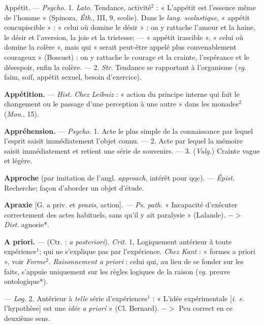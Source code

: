 \begin{itemize}[leftmargin=1cm, label=, itemsep=1pt]
{{{{\item {\bf }Appétit. — \textsf{\textit {Psycho.}} 1. {\it Lato}. Tendance,
activité$^2$ : « L'appétit est l'essence
même de l’homme » (Spinoza, {\it Éth}.,
III, 9, scolie). Dans le {\it lang. scolastique}, « appétit concupiscible » :
« celui où domine le désir » : on y
rattache l'amour et la haine, le désir
et l’aversion, la joie et la tristesse; —
« appétit irascible », « celui où domine
la colère », mais qui « serait peut-être
appelé plus convenablement courageux » (Bossuet) : on y rattache le
courage et la crainte, l'espérance et
le désespoir, enfin la colère. — 2. {\it Str}.
Tendance se rapportant à l'organisme ({\it vg}. faim, soif, appétit sexuel,
besoin d’exercice).

\item {\bf Appétition.} — \textsf{\textit {Hist.}} {\it Chez Leibniz} :
« action du principe interne qui fait
le changement ou le passage d’une
perception à une autre » dans les
monades$^2$ ({\it Mon}., 15).

\item {\bf Appréhension.} — \textsf{\textit {Psycho.}} 1. Acte le
plus simple de la connaissance par
lequel l'esprit saisit immédiatement
l’objet connu. — 2. Acte par lequel
la mémoire saisit immédiatement et
retient une série de souvenirs. —
3. (\textsf{\textit {Vulg.}}) Crainte vague et légère.

\item {\bf Approche} (par imitation de l’angl.
{\it approach}, intérêt pour qqc). —
\textsf{\textit {Épist.}} Recherche; façon d’aborder
un objet d'étude.

\item {\bf Apraxie} [G. a priv. et {\it praxis}, action].
— \textsf{\textit {Ps. path.}} « Incapacité d'exécuter
correctement des actes habituels,
sans qu'il y ait paralysie » (Lalande).
$->$ {\it Dist}. agnosie*.

\item {\bf A priori.} — (Ctr. : {\it a posteriori}). \textsf{\textit {Crit.}}
1, Logiquement antérieur à toute
expérience$^1$; qui ne s'explique pas
par l'expérience. {\it Chez Kant} : « formes
a priori », voir {\it Forme}$^2$. {\it Raisonnement a priori} : celui qui, au lieu de
se fonder sur les faits, s’appuie uniquement sur les règles logiques de la
raison ({\it vg.} preuve ontologique*).

— \textsf{\textit {Log.}} 2. Antérieur à {\it telle} série
d’expériences$^1$ : « L'idée expérimentale [{\it i. e.} l'hypothèse] est une {\it idée
a priori} » (Cl. Bernard). $->$ Peu
correct en ce deuxième sens.

}}}}
\end{itemize}
